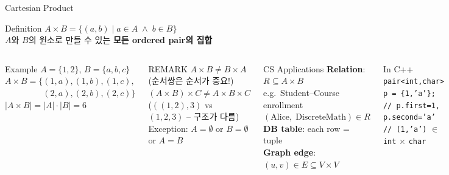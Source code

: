 \documentclass{beamer}
\begin{document}
\begin{frame}[t,shrink=3]{Cartesian Product}
    \small
    \vspace{0.1cm}
    \begin{block}{Definition}
        $A \times B = \{(a, b) \mid a \in A \;\land\; b \in B\}$\\[4pt]
        \footnotesize $A$와 $B$의 원소로 만들 수 있는 \textbf{모든 ordered pair의 집합}
    \end{block}

    \vspace{0.1cm}
    \begin{columns}[T]
        \begin{exampleblock}{Example}
            \footnotesize
            $A = \{1, 2\}$, $B = \{a, b, c\}$\\[4pt]
            $A \times B = \{(1,a),(1,b),(1,c),$\\
            $\phantom{A \times B = \{}(2,a),(2,b),(2,c)\}$\\[4pt]
            $|A \times B| = |A| \cdot |B| = 6$
        \end{exampleblock}

        \vspace{0.08cm}
        \begin{alertblock}{REMARK}
            \scriptsize
            $A \times B \neq B \times A$ \; (순서쌍은 순서가 중요!)\\
            $(A \times B) \times C \neq A \times B \times C$\\
            ($((1,2),3)$ vs $(1,2,3)$ -- 구조가 다름)\\[2pt]
            Exception: $A = \emptyset$ or $B = \emptyset$ or $A = B$
        \end{alertblock}

        \begin{block}{CS Applications}
            \footnotesize
            \textbf{Relation}: $R \subseteq A \times B$\\[4pt]
            e.g.\ Student--Course enrollment\\
            $(\text{Alice},\; \text{DiscreteMath}) \in R$\\[6pt]
            \textbf{DB table}: each row = tuple\\
            \textbf{Graph edge}: $(u, v) \in E \subseteq V \times V$
        \end{block}

        \vspace{0.08cm}
        \begin{exampleblock}{\scriptsize In C++}
            \scriptsize
            \texttt{pair<int,char> p = \{1,'a'\};}\\
            \texttt{// p.first=1, p.second='a'}\\
            \texttt{// (1,'a')} $\in$ \texttt{int} $\times$ \texttt{char}
        \end{exampleblock}
    \end{columns}
\end{frame}
\end{document}
